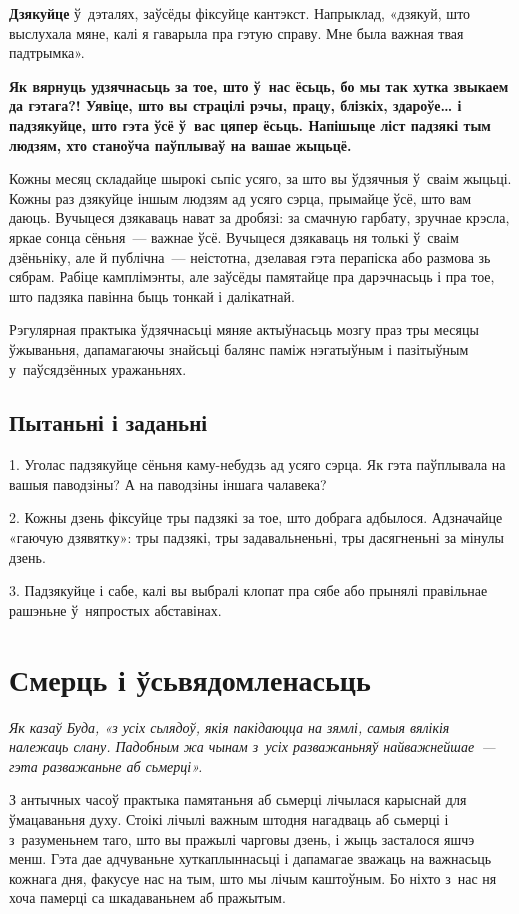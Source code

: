 \textbf{Дзякуйце} ў~дэталях, заўсёды фіксуйце кантэкст. Напрыклад, «дзякуй, што выслухала мяне, калі я гаварыла пра гэтую справу. Мне была важная твая падтрымка».

\textbf{Як вярнуць удзячнасьць за тое, што ў~нас ёсьць, бо мы так хутка звыкаем да гэтага?! Уявіце, што вы страцілі рэчы, працу, блізкіх, здароўе… і падзякуйце, што гэта ўсё ў~вас цяпер ёсьць. Напішыце ліст падзякі тым людзям, хто станоўча паўплываў на вашае жыцьцё.}

Кожны месяц складайце шырокі сьпіс усяго, за што вы ўдзячныя ў~сваім жыцьці. Кожны раз дзякуйце іншым людзям ад усяго сэрца, прымайце ўсё, што вам даюць. Вучыцеся дзякаваць нават за дробязі: за смачную гарбату, зручнае крэсла, яркае сонца сёньня~--- важнае ўсё. Вучыцеся дзякаваць ня толькі ў~сваім дзёньніку, але й публічна~--- неістотна, дзелавая гэта перапіска або размова зь сябрам. Рабіце камплімэнты, але заўсёды памятайце пра дарэчнасьць і пра тое, што падзяка павінна быць тонкай і далікатнай.

Рэгулярная практыка ўдзячнасьці мяняе актыўнасьць мозгу праз тры месяцы ўжываньня, дапамагаючы знайсьці балянс паміж нэгатыўным і пазітыўным у~паўсядзённых уражаньнях.

\subsection*{Пытаньні і заданьні}

1. Уголас падзякуйце сёньня каму-небудзь ад усяго сэрца. Як гэта паўплывала на вашыя паводзіны? А на паводзіны іншага чалавека?

2. Кожны дзень фіксуйце тры падзякі за тое, што добрага адбылося. Адзначайце «гаючую дзявятку»: тры падзякі, тры задавальненьні, тры дасягненьні за мінулы дзень.

3. Падзякуйце і сабе, калі вы выбралі клопат пра сябе або прынялі правільнае рашэньне ў~няпростых абставінах.


\section{Смерць і ўсьвядомленасьць}

\emph{Як казаў Буда, «з усіх сьлядоў, якія пакідаюцца на зямлі, самыя вялікія належаць слану. Падобным жа чынам з~усіх разважаньняў найважнейшае~--- гэта разважаньне аб сьмерці».}

З антычных часоў практыка памятаньня аб сьмерці лічылася карыснай для ўмацаваньня духу. Стоікі лічылі важным штодня нагадваць аб сьмерці і з~разуменьнем таго, што вы пражылі чарговы дзень, і жыць засталося яшчэ менш. Гэта дае адчуваньне хуткаплыннасьці і дапамагае зважаць на важнасьць кожнага дня, факусуе нас на тым, што мы лічым каштоўным. Бо ніхто з~нас ня хоча памерці са шкадаваньнем аб пражытым.

